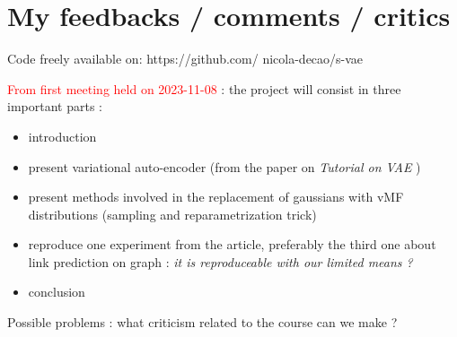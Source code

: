 \documentclass[12pt]{article}
\newcommand{\red}[1]{\textcolor{red}{#1}}
\begin{document}
\section{My feedbacks / comments / critics}

Code freely available on: https://github.com/ nicola-decao/s-vae

\red{From first meeting held on 2023-11-08} : the project will consist in three important parts :
\begin{itemize}
    \item introduction
    \item present variational auto-encoder (from the paper on \textit{Tutorial on VAE} )
    \item present methods involved in the replacement of gaussians with vMF distributions (sampling and reparametrization trick)
    \item reproduce one experiment from the article, preferably the third one about link prediction on graph : \textit{it is reproduceable with our limited means ?} 
    \item conclusion
\end{itemize}

Possible problems : what criticism related to the course can we make ? 
\end{document}
